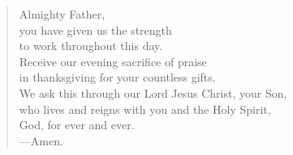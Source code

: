 \prayer

\setlength{\vleftmargin}{\prayerleftmargini}

\begin{verse}
Almighty Father,\\
you have given us the strength\\
to work throughout this day.\\
Receive our evening sacrifice of praise\\
in thanksgiving for your countless gifts.\\
We ask this through our Lord Jesus Christ, your Son,\\
who lives and reigns with you and the Holy Spirit,\\
God, for ever and ever.\\
{\color{red}---\thinspace}Amen.
\end{verse}

\setlength{\vleftmargin}{\defleftmargini}